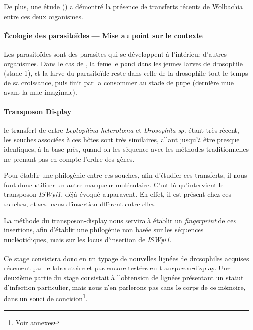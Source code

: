 De plus, une étude (\cite{vavre1999}) a démontré la présence de transferts récents de Wolbachia entre ces deux organismes.

\begin{encart}
\paragraph{Écologie des parasitoïdes — Mise au point sur le contexte} %
\label{par:parasitoïdes}
Les parasitoïdes sont des parasites qui se développent à l’intérieur d’autres organismes. Dans le cas de , la femelle pond dans les jeunes larves de drosophile (stade 1), et la larve du parasitoïde reste dans celle de la drosophile tout le temps de sa croissance, puis finit par la consommer au stade de pupe (dernière mue avant la mue imaginale).
\end{encart}

\paragraph{Transposon Display\\} %
\label{par:transposon_display}
le transfert de  entre \textit{Leptopilina heterotoma} et \textit{Drosophila sp.} étant très récent, les souches associées à ces hôtes sont très similaires, allant jusqu’à être presque identiques, à la base près, quand on les séquence avec les méthodes traditionnelles ne prenant pas en compte l’ordre des gènes.

Pour établir une philogénie entre ces souches, afin d’étudier ces transferts, il nous faut donc utiliser un autre marqueur moléculaire. C’est là qu’intervient le transposon \textit{ISWpi1}, déjà évoqué auparavent. En effet, il est présent chez ces souches, et ses locus d’insertion dffèrent entre elles.

La méthode du transposon-display nous servira à établir un \textit{fingerprint} de ces insertions, afin d’établir une philogénie non basée sur les séquences nucléotidiques, mais sur les locus d’insertion de \textit{ISWpi1}.

\paragraph{} %
\label{par:Sujet}
Ce stage consistera donc en un typage de nouvelles lignées de drosophiles acquises récement par le laboratoire et pas encore testées en transposon-display. Une deuxième partie du stage consistait à l’obtension de lignées  présentant un statut d'infection particulier, mais nous n'en parlerons pas cans le corps de ce mémoire, dans un souci de concision\footnote{Voir annexes}.

